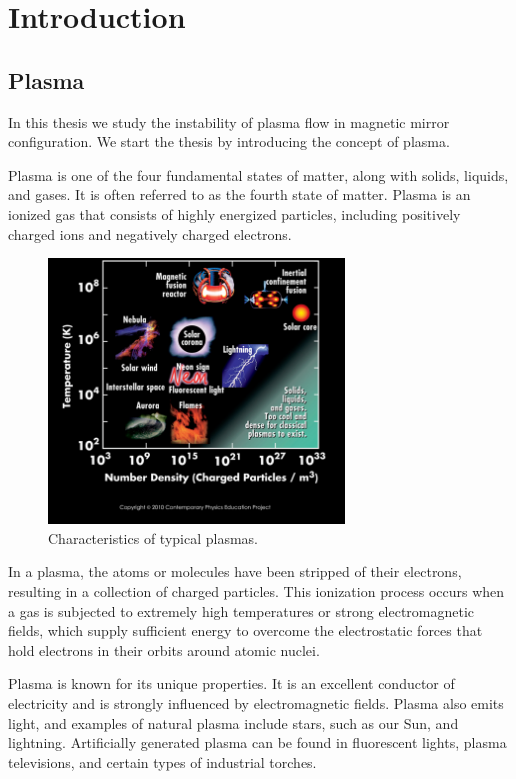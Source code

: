\chapter{Introduction}
\section{Plasma}
In this thesis we study the instability of plasma flow in magnetic mirror configuration.
We start the thesis by introducing the concept of plasma.

Plasma is one of the four fundamental states of matter, along with solids, liquids, and gases.
It is often referred to as the fourth state of matter.
Plasma is an ionized gas that consists of highly energized particles, including positively charged ions and negatively charged electrons.

\begin{figure}[htbp]
	\centering
	\includegraphics[width=0.7\textwidth]{img/plasma-properties}
	\caption{Characteristics of typical plasmas.}
	\label{fig:plasma-properties}
\end{figure}

In a plasma, the atoms or molecules have been stripped of their electrons, resulting in a collection of charged particles.
This ionization process occurs when a gas is subjected to extremely high temperatures or strong electromagnetic fields, which supply sufficient energy to overcome the electrostatic forces that hold electrons in their orbits around atomic nuclei.

Plasma is known for its unique properties.
It is an excellent conductor of electricity and is strongly influenced by electromagnetic fields.
Plasma also emits light, and examples of natural plasma include stars, such as our Sun, and lightning.
Artificially generated plasma can be found in fluorescent lights, plasma televisions, and certain types of industrial torches.

